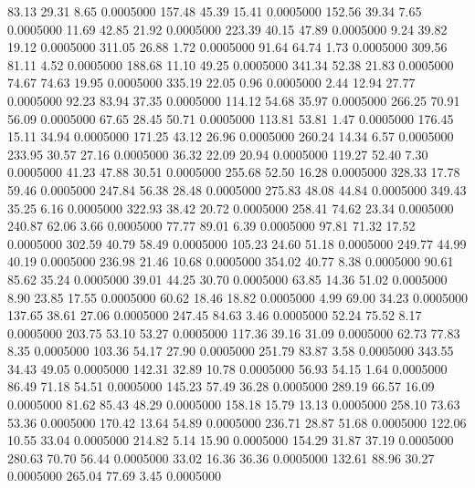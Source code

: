   83.13   29.31    8.65   0.0005000
 157.48   45.39   15.41   0.0005000
 152.56   39.34    7.65   0.0005000
  11.69   42.85   21.92   0.0005000
 223.39   40.15   47.89   0.0005000
   9.24   39.82   19.12   0.0005000
 311.05   26.88    1.72   0.0005000
  91.64   64.74    1.73   0.0005000
 309.56   81.11    4.52   0.0005000
 188.68   11.10   49.25   0.0005000
 341.34   52.38   21.83   0.0005000
  74.67   74.63   19.95   0.0005000
 335.19   22.05    0.96   0.0005000
   2.44   12.94   27.77   0.0005000
  92.23   83.94   37.35   0.0005000
 114.12   54.68   35.97   0.0005000
 266.25   70.91   56.09   0.0005000
  67.65   28.45   50.71   0.0005000
 113.81   53.81    1.47   0.0005000
 176.45   15.11   34.94   0.0005000
 171.25   43.12   26.96   0.0005000
 260.24   14.34    6.57   0.0005000
 233.95   30.57   27.16   0.0005000
  36.32   22.09   20.94   0.0005000
 119.27   52.40    7.30   0.0005000
  41.23   47.88   30.51   0.0005000
 255.68   52.50   16.28   0.0005000
 328.33   17.78   59.46   0.0005000
 247.84   56.38   28.48   0.0005000
 275.83   48.08   44.84   0.0005000
 349.43   35.25    6.16   0.0005000
 322.93   38.42   20.72   0.0005000
 258.41   74.62   23.34   0.0005000
 240.87   62.06    3.66   0.0005000
  77.77   89.01    6.39   0.0005000
  97.81   71.32   17.52   0.0005000
 302.59   40.79   58.49   0.0005000
 105.23   24.60   51.18   0.0005000
 249.77   44.99   40.19   0.0005000
 236.98   21.46   10.68   0.0005000
 354.02   40.77    8.38   0.0005000
  90.61   85.62   35.24   0.0005000
  39.01   44.25   30.70   0.0005000
  63.85   14.36   51.02   0.0005000
   8.90   23.85   17.55   0.0005000
  60.62   18.46   18.82   0.0005000
   4.99   69.00   34.23   0.0005000
 137.65   38.61   27.06   0.0005000
 247.45   84.63    3.46   0.0005000
  52.24   75.52    8.17   0.0005000
 203.75   53.10   53.27   0.0005000
 117.36   39.16   31.09   0.0005000
  62.73   77.83    8.35   0.0005000
 103.36   54.17   27.90   0.0005000
 251.79   83.87    3.58   0.0005000
 343.55   34.43   49.05   0.0005000
 142.31   32.89   10.78   0.0005000
  56.93   54.15    1.64   0.0005000
  86.49   71.18   54.51   0.0005000
 145.23   57.49   36.28   0.0005000
 289.19   66.57   16.09   0.0005000
  81.62   85.43   48.29   0.0005000
 158.18   15.79   13.13   0.0005000
 258.10   73.63   53.36   0.0005000
 170.42   13.64   54.89   0.0005000
 236.71   28.87   51.68   0.0005000
 122.06   10.55   33.04   0.0005000
 214.82    5.14   15.90   0.0005000
 154.29   31.87   37.19   0.0005000
 280.63   70.70   56.44   0.0005000
  33.02   16.36   36.36   0.0005000
 132.61   88.96   30.27   0.0005000
 265.04   77.69    3.45   0.0005000
